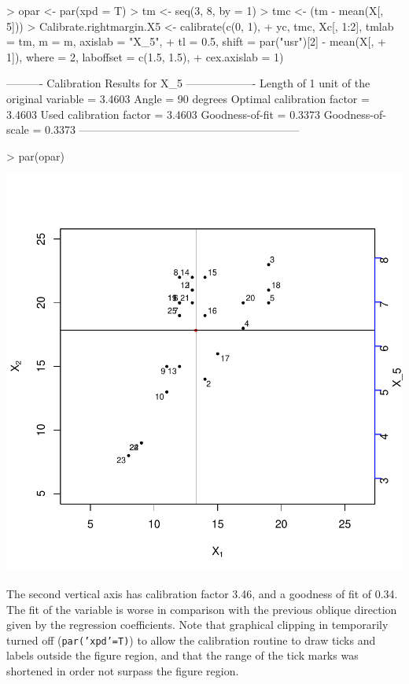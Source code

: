 \documentclass[a4paper]{article}
\begin{document}
\begin{Schunk}
\begin{Sinput}
> opar <- par(xpd = T)
> tm <- seq(3, 8, by = 1)
> tmc <- (tm - mean(X[, 5]))
> Calibrate.rightmargin.X5 <- calibrate(c(0, 1), 
+     yc, tmc, Xc[, 1:2], tmlab = tm, m = m, axislab = "X_5", 
+     tl = 0.5, shift = par("usr")[2] - mean(X[, 
+         1]), where = 2, laboffset = c(1.5, 1.5), 
+     cex.axislab = 1)
\end{Sinput}
\begin{Soutput}
---------- Calibration Results for  X_5  -------------------
Length of 1 unit of the original variable =  3.4603  
Angle                                     =  90 degrees
Optimal calibration factor                =  3.4603  
Used calibration factor                   =  3.4603  
Goodness-of-fit                           =  0.3373  
Goodness-of-scale                         =  0.3373  
------------------------------------------------------------
\end{Soutput}
\begin{Sinput}
> par(opar)
\end{Sinput}
\end{Schunk}
\includegraphics{CalibrationGuide-007}

The second vertical axis has calibration factor 3.46, and a goodness of fit of 0.34. The fit of the
variable is worse in comparison with the previous oblique direction given by the regression coefficients. Note
that graphical clipping in temporarily turned off ({\tt par('xpd'=T)}) to allow the calibration 
routine to draw ticks and labels outside the figure region, and that the range of the tick marks was
shortened in order not surpass the figure region.
\clearpage
\end{document}
